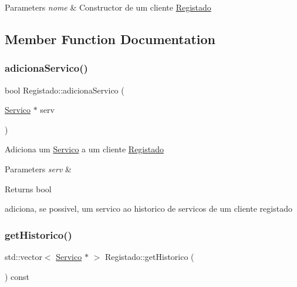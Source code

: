 \begin{DoxyParams}{Parameters}
{\em nome} & Constructor de um cliente \hyperlink{class_registado}{Registado} \\
\hline
\end{DoxyParams}


\subsection{Member Function Documentation}
\hypertarget{class_registado_acc2088074502804017ff3e40022d966c}{}\label{class_registado_acc2088074502804017ff3e40022d966c} 
\subsubsection{\texorpdfstring{adiciona\+Servico()}{adicionaServico()}}
{\footnotesize\ttfamily bool Registado\+::adiciona\+Servico (\begin{DoxyParamCaption}\item[{\hyperlink{class_servico}{Servico} $\ast$}]{serv }\end{DoxyParamCaption})}

Adiciona um \hyperlink{class_servico}{Servico} a um cliente \hyperlink{class_registado}{Registado}


\begin{DoxyParams}{Parameters}
{\em serv} & \\
\hline
\end{DoxyParams}
\begin{DoxyReturn}{Returns}
bool
\end{DoxyReturn}
adiciona, se possivel, um servico ao historico de servicos de um cliente registado \hypertarget{class_registado_a304848f6ce1d82ad8438ec5e273cbc2d}{}\label{class_registado_a304848f6ce1d82ad8438ec5e273cbc2d} 
\subsubsection{\texorpdfstring{get\+Historico()}{getHistorico()}}
{\footnotesize\ttfamily std\+::vector$<$ \hyperlink{class_servico}{Servico} $\ast$ $>$ Registado\+::get\+Historico (\begin{DoxyParamCaption}{ }\end{DoxyParamCaption}) const}

